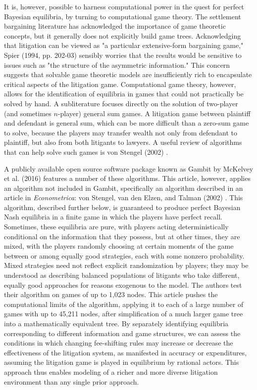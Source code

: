 \documentclass{article}
\begin{document}
It is, however, possible to harness computational power in the quest for perfect Bayesian equilibria, by turning to computational game theory. The settlement bargaining literature has acknowledged the importance of game theoretic concepts, but it generally does not explicitly build game trees. Acknowledging that litigation can be viewed as "a particular extensive-form bargaining game," Spier (1994, pp. 202-03) \cite{spier} sensibly worries that the results would be sensitive to issues such as "the structure of the asymmetric information." This concern suggests that solvable game theoretic models are insufficiently rich to encapsulate critical aspects of the litigation game. Computational game theory, however, allows for the identification of equilibria in games that could not practically be solved by hand. A subliterature focuses directly on the solution of two-player (and sometimes $n$-player) general sum games. A litigation game between plaintiff and defendant is general sum, which can be more difficult than a zero-sum game to solve, because the players may transfer wealth not only from defendant to plaintiff, but also from both litigants to lawyers. A useful review of algorithms that can help solve such games is von Stengel (2002) \cite{vonstengel2002}.

A publicly available open source software package known as Gambit by McKelvey et al. (2016) \cite{mckelvey} features a number of these algorithms. This article, however, applies an algorithm not included in Gambit, specifically an algorithm described in an article in \textit{Econometrica}: von Stengel, van den Elzen, and Talman (2002) \cite{vonstengelvandenelzentalman}. This algorithm, described further below, is guaranteed to produce perfect Bayesian Nash equilibria in a finite game in which the players have perfect recall. Sometimes, these equilibria are pure, with players acting deterministically conditional on the information that they possess, but at other times, they are mixed, with the players randomly choosing at certain moments of the game between or among equally good strategies, each with some nonzero probability. Mixed strategies need not reflect explicit randomization by players; they may be understood as describing balanced populations of litigants who take different, equally good approaches for reasons exogenous to the model. The authors test their algorithm on games of up to 1,023 nodes. This article pushes the computational limits of the algorithm, applying it to each of a large number of games with up to 45,211 nodes, after simplification of a much larger game tree into a mathematically equivalent tree. By separately identifying equilibria corresponding to different information and game structures, we can assess the conditions in which changing fee-shifting rules may increase or decrease the effectiveness of the litigation system, as manifested in accuracy or expenditures, assuming the litigation game is played in equilibrium by rational actors. This approach thus enables modeling of a richer and more diverse litigation environment than any single prior approach.
\end{document}
